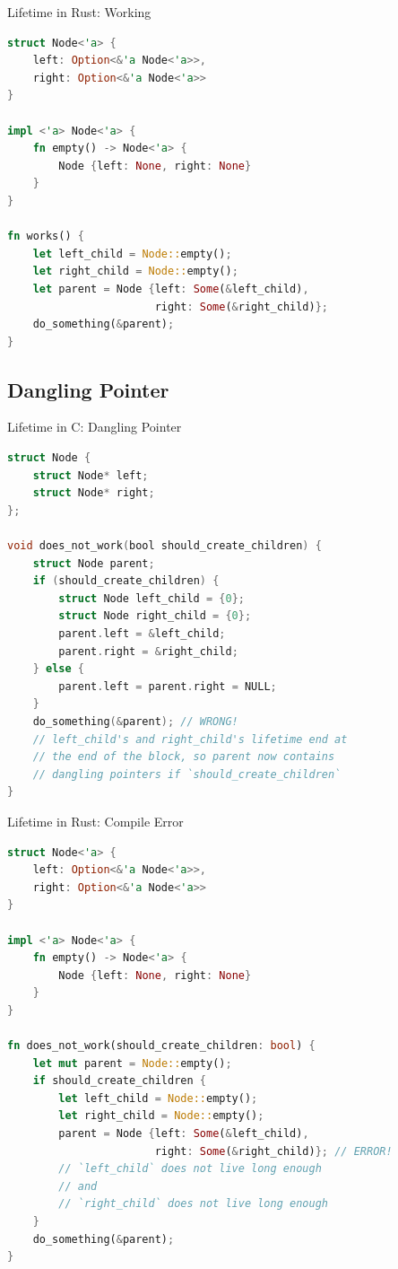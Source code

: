 \begin{Frame}[fragile]{Lifetime in Rust: Working}
\begin{lstlisting}[language=Rust]
struct Node<'a> {
    left: Option<&'a Node<'a>>,
    right: Option<&'a Node<'a>>
}

impl <'a> Node<'a> {
    fn empty() -> Node<'a> {
        Node {left: None, right: None}
    }
}

fn works() {
    let left_child = Node::empty();
    let right_child = Node::empty();
    let parent = Node {left: Some(&left_child),
                       right: Some(&right_child)};
    do_something(&parent);
}
\end{lstlisting}
\end{Frame}

\subsection{Dangling Pointer}

\begin{Frame}[fragile]{Lifetime in C: Dangling Pointer}
\begin{lstlisting}[language=C]
struct Node {
    struct Node* left;
    struct Node* right;
};

void does_not_work(bool should_create_children) {
    struct Node parent;
    if (should_create_children) {
        struct Node left_child = {0};
        struct Node right_child = {0};
        parent.left = &left_child;
        parent.right = &right_child;
    } else {
        parent.left = parent.right = NULL;
    }
    do_something(&parent); // WRONG!
    // left_child's and right_child's lifetime end at
    // the end of the block, so parent now contains
    // dangling pointers if `should_create_children`
}
\end{lstlisting}
\end{Frame}

\begin{Frame}[fragile]{Lifetime in Rust: Compile Error}
\begin{lstlisting}[language=Rust]
struct Node<'a> {
    left: Option<&'a Node<'a>>,
    right: Option<&'a Node<'a>>
}

impl <'a> Node<'a> {
    fn empty() -> Node<'a> {
        Node {left: None, right: None}
    }
}

fn does_not_work(should_create_children: bool) {
    let mut parent = Node::empty();
    if should_create_children {
        let left_child = Node::empty();
        let right_child = Node::empty();
        parent = Node {left: Some(&left_child),
                       right: Some(&right_child)}; // ERROR!
        // `left_child` does not live long enough
        // and
        // `right_child` does not live long enough
    }
    do_something(&parent);
}
\end{lstlisting}
\end{Frame}

